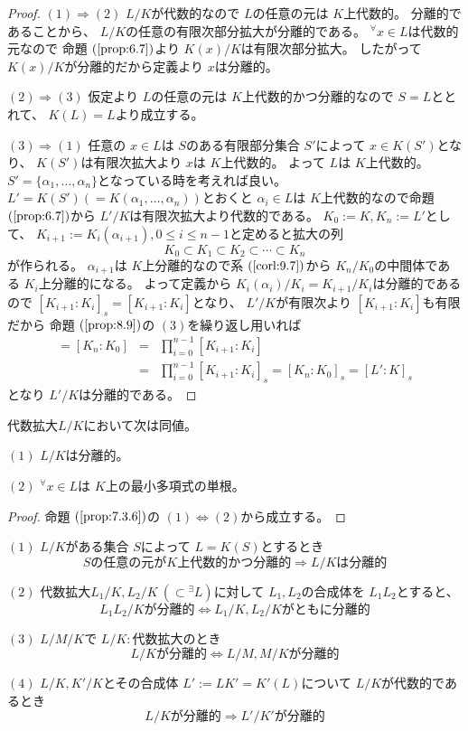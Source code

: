 \documentclass[../master_galois_theory]{subfiles}
\begin{document}
\begin{proof}
  $(1) \Rightarrow (2)$
  $L/K$が代数的なので $L$の任意の元は $K$上代数的。
  分離的であることから、 $L/K$の任意の有限次部分拡大が分離的である。
  ${}^\forall x \in L$は代数的元なので
  命題 $(\mathrm{\ref{prop:6.7}})$より $K(x)/K$は有限次部分拡大。
  したがって $K(x)/K$が分離的だから定義より $x$は分離的。

  $(2) \Rightarrow (3)$
  仮定より $L$の任意の元は $K$上代数的かつ分離的なので
  $S = L$ととれて、 $K(L) = L$より成立する。

  $(3) \Rightarrow (1)$
  任意の $x \in L$は $S$のある有限部分集合 $S'$によって
  $x \in K(S')$となり、 $K(S')$は有限次拡大より $x$は $K$上代数的。
  よって $L$は $K$上代数的。
  $S' = \{ \alpha_1 , \dots , \alpha_n \}$となっている時を考えれば良い。
  $L' = K(S') (= K(\alpha_1 , \dots , \alpha_n))$とおくと $\alpha_i \in L$は $K$上代数的なので命題 $(\mathrm{\ref{prop:6.7}})$から
  $L'/K$は有限次拡大より代数的である。
  $K_0 := K , K_n := L'$として、 $K_{i+1} := K_i(\alpha_{i+1}) , 0 \leq i \leq n-1$と定めると拡大の列
  \[
  K_0 \subset K_1 \subset K_2 \subset \cdots \subset K_n
  \]
  が作られる。
  $\alpha_{i+1}$は $K$上分離的なので系 $(\mathrm{\ref{corl:9.7}})$から
  $K_n/K_0$の中間体である $K_i$上分離的になる。
  よって定義から $K_i(\alpha_i)/K_i = K_{i+1}/K_i$は分離的であるので
  $[K_{i+1}:K_i]_s = [K_{i+1}:K_i]$となり、
  $L'/K$が有限次より $[K_{i+1}:K_i]$も有限だから
  命題 $(\mathrm{\ref{prop:8.9}})$の $(3)$を繰り返し用いれば
  \begin{eqnarray*}
    [L':K] = [K_n:K_0] & = & \prod_{i=0}^{n-1} [K_{i+1}:K_i] \\
    & = & \prod_{i=0}^{n-1} [K_{i+1}:K_i]_s = [K_n:K_0]_s = [L':K]_s
  \end{eqnarray*}
  となり $L'/K$は分離的である。
\end{proof}

\begin{corl} \label{corl:separable}
  代数拡大$L/K$において次は同値。

  $(1)$
  $L/K$は分離的。

  $(2)$
  ${}^\forall x \in L$は $K$上の最小多項式の単根。
\end{corl}

\begin{proof}
  命題 $(\mathrm{\ref{prop:7.3.6}})$の $(1) \Leftrightarrow (2)$から成立する。
\end{proof}

\begin{prop} \label{prop:9.9}
  $(1)$
  $L/K$がある集合 $S$によって $L = K(S)$とするとき
  \[
    Sの任意の元が K上代数的かつ分離的 \Rightarrow
    L/K は分離的
  \]

  $(2)$
  代数拡大$L_1/K , L_2/K \  (\subset {}^\exists L)$に対して
  $L_1 , L_2$の合成体を $L_1 L_2$とすると、
  \[
  L_1 L_2 / Kが分離的 \Leftrightarrow L_1/K , L_2/Kがともに分離的
  \]

  $(3)$
  $L/M/K$で $L/K:$代数拡大のとき
  \[
  L/Kが分離的 \Leftrightarrow L/M , M/Kが分離的
  \]

  $(4)$
  $L/K , K'/K$とその合成体 $L' := L K' = K'(L)$について
  $L/K$が代数的であるとき
  \[
  L/Kが分離的 \Rightarrow L'/K'が分離的
  \]
\end{prop}
\end{document}
